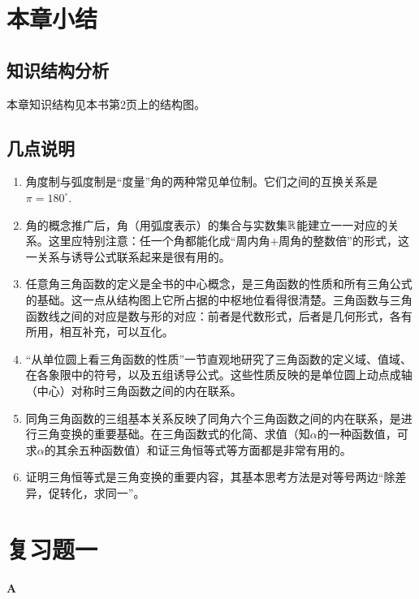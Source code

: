 \section{本章小结}
\subsection{知识结构分析}

本章知识结构见本书第2页上的结构图。


\subsection{几点说明}
\begin{enumerate}
\item 角度制与弧度制是“度量”角的两种常见单位制。它们之间的互换关系是$\pi=180^{\circ}$.
\item 角的概念推广后，角（用弧度表示）的集合与实数集$\mathbb{R}$能建立一一对应的关系。这里应特别注意：任一个角都能化成“周内角$+$周角的整数倍”的形式，这一关系与诱导公式联系起来是很有用的。
\item 任意角三角函数的定义是全书的中心概念，是三角函数的性质和所有三角公式的基础。这一点从结构图上它所占据的中枢地位看得很清楚。三角函数与三角函数线之间的对应是数与形的对应：前者是代数形式，后者是几何形式，各有所用，相互补充，可以互化。
\item “从单位圆上看三角函数的性质”一节直观地研究了三角函数的定义域、值域、在各象限中的符号，以及五组诱导公式。这些性质反映的是单位圆上动点成轴（中心）对称时三角函数之间的内在联系。
\item 同角三角函数的三组基本关系反映了同角六个三角函数之间的内在联系，是进行三角变换的重要基础。在三角函数式的化简、求值（知$\alpha$的一种函数值，可求$\alpha$的其余五种函数值）和证三角恒等式等方面都是非常有用的。
\item 证明三角恒等式是三角变换的重要内容，其基本思考方法是对等号两边“除差异，促转化，求同一”。
\end{enumerate}

\section*{复习题一}

\begin{center}
\bfseries A
\end{center}

